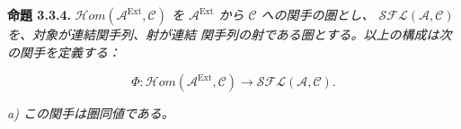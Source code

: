 \medskip\noindent\textbf{命題 3.3.4.}\quad
\textit{$\mathcal H\!om(\mathcal A^{\operatorname{Ext}},\mathcal C)$ を
$\mathcal A^{\operatorname{Ext}}$ から $\mathcal C$ への関手の圏とし、
$\mathcal{SFL}(\mathcal A,\mathcal C)$ を、対象が連結関手列、射が連結
関手列の射である圏とする。以上の構成は次の関手を定義する：}

\[
\Phi\colon
\mathcal H\!om(\mathcal A^{\operatorname{Ext}},\mathcal C)
\longrightarrow\mathcal{SFL}(\mathcal A,\mathcal C).
\]

\noindent\textit{a) この関手は圏同値である。}
\endgroup
